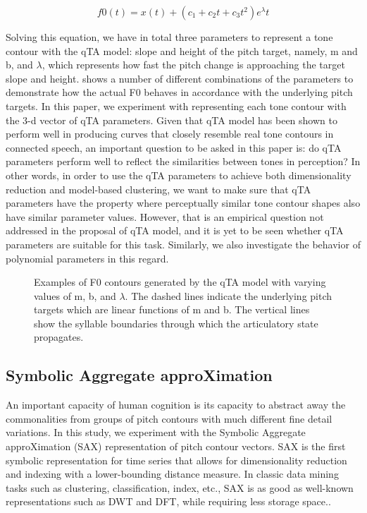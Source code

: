 \documentclass{article}
\begin{document}
\begin{equation}
f0(t)=x(t)+(c_1+c_2t+c_3t^2)e^\lambda t
\end{equation}

Solving this equation, we have in total three parameters to represent a tone contour with the qTA model: slope and height of the pitch target, namely, m and b, and $\lambda$, which represents how fast the pitch change is approaching the target slope and height.  shows a number of different combinations of the parameters to demonstrate how the actual F0 behaves in accordance with the underlying pitch targets. In this paper, we experiment with representing each tone contour with the 3-d vector of qTA parameters. Given that qTA model has been shown to perform well in producing curves that closely resemble real tone contours in connected speech, an important question to be asked in this paper is: do qTA parameters perform well to reflect the similarities between tones in perception? In other words, in order to use the qTA parameters to achieve both dimensionality reduction and model-based clustering, we want to make sure that qTA parameters have the property where perceptually similar tone contour shapes also have similar parameter values. However, that is an empirical question not addressed in the proposal of qTA model, and it is yet to be seen whether qTA parameters are suitable for this task. Similarly, we also investigate the behavior of polynomial parameters in this regard.



\begin{figure}[h]
 \centerline{}
 \caption{Examples of F0 contours generated by the qTA model with varying values of m, b, and $\lambda$. The dashed lines indicate the underlying pitch targets which are linear functions of m and b. The vertical lines show the syllable boundaries through which the articulatory state propagates.}
 \label{fig:qta}
\end{figure}


\subsection{Symbolic Aggregate approXimation}
An important capacity of human cognition is its capacity to abstract away the commonalities from groups of pitch contours with much different fine detail variations. In this study, we experiment with the Symbolic Aggregate approXimation (SAX) representation of pitch contour vectors. SAX is the first symbolic representation for time series that allows for dimensionality reduction and indexing with a lower-bounding distance measure. In classic data mining tasks such as clustering, classification, index, etc., SAX is as good as well-known representations such as DWT and DFT, while requiring less storage space.\cite{Lin:07}.
\end{document}
